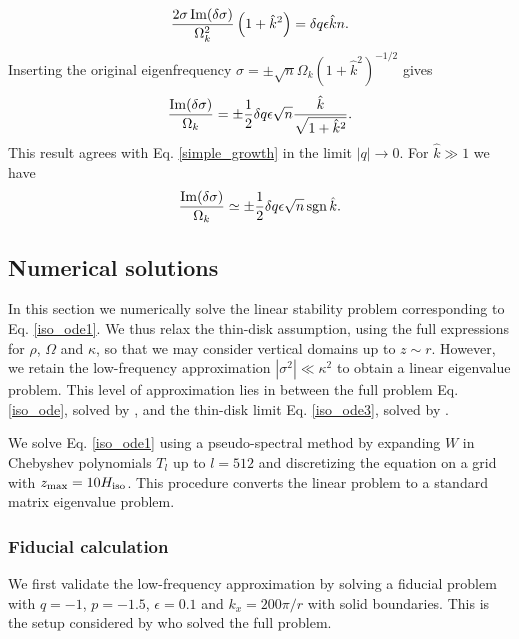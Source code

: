  \begin{align}
  \frac{2\sigma\operatorname{Im}(\delta\sigma)}{\Omega_k^2}
  \left(1+\hat{k}^2\right) = \delta q \epsilon \hat{k} n.
 \end{align}
Inserting the original eigenfrequency $\sigma = \pm
\sqrt{n}\Omega_k(1+\hat{k}^2)^{-1/2}$ gives
\begin{align}
  \frac{\operatorname{Im}(\delta\sigma)}{\Omega_k} = \pm \frac{1}{2}\delta q \epsilon
  \sqrt{n} \frac{\hat{k}}{\sqrt{1+\hat{k}^2}}. 
\end{align}
This result agrees with Eq. \ref{simple_growth} in the limit
$|q|\to0$. 
For $\hat{k}\gg 1$ we have
\begin{align}
  \frac{\operatorname{Im}(\delta\sigma)}{\Omega_k} \simeq \pm \frac{1}{2}\delta q \epsilon
  \sqrt{n} \operatorname{sgn}{\hat{k}}. 
\end{align}




\subsection{Numerical solutions}
In this section we numerically solve the linear stability problem
corresponding to Eq. \ref{iso_ode1}. We thus relax the thin-disk
assumption, using the full expressions for $\rho$, $\Omega$ and
$\kappa$, so that we may consider vertical domains up to $z\sim r$.
However, we retain the low-frequency approximation
$|\sigma^2|\ll\kappa^2$ to obtain a linear eigenvalue problem. This
level of approximation lies in between the full problem 
Eq. \ref{iso_ode}, solved by \cite{mcnally14}, and the thin-disk
limit Eq. \ref{iso_ode3}, solved by \cite{nelson13}.   

We solve Eq. \ref{iso_ode1} using a pseudo-spectral method by
expanding $W$ in Chebyshev polynomials $T_l$ up to $l=512$ and
discretizing the equation on a grid with
$z_\mathrm{max}=10H_\mathrm{iso}$. This procedure converts the linear problem
to a standard matrix eigenvalue problem. %

\subsubsection{Fiducial calculation}
We first validate the low-frequency approximation by solving a 
fiducial problem with $q=-1$, $p=-1.5$, $\epsilon=0.1$ and $k_x =
200\pi/r$ with solid boundaries. This is the setup considered by
\cite{mcnally14} who solved the full problem. 

